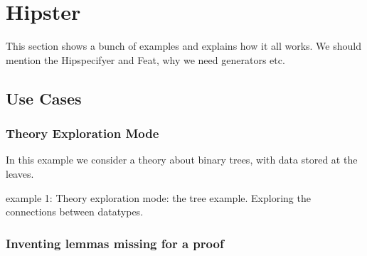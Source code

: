 \section{Hipster}
\label{sec:hipster}

This section shows a bunch of examples and explains how it all works. We should mention the Hipspecifyer and Feat, why we need generators etc. 


\subsection{Use Cases}
\subsubsection{Theory Exploration Mode}
In this example we consider a theory about binary trees, with data stored at the leaves. 

 
example 1: Theory exploration mode: the tree example. Exploring the connections between datatypes. 

\subsubsection{Inventing lemmas missing for a proof}
